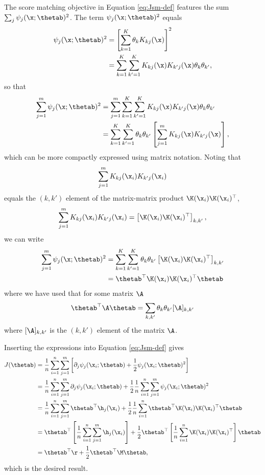 \begin{exenumerate}
\begin{solution}
    The score matching objective in Equation \eqref{eq:Jsm-def}  features the sum $\sum_j \psi_j(\x;\thetab)^2$. The term $\psi_j(\x;\thetab)^2$ equals
    \begin{align}
      \psi_j(\x; \thetab)^2 & = \left[ \sum_{k=1}^K \theta_k K_{kj}(\x)\right]^2\\
      & =  \sum_{k=1}^K \sum_{k'=1}^K  K_{kj}(\x) K_{k'j}(\x) \theta_{k} \theta_{k'},
    \end{align}
    so that
    \begin{align}
      \sum_{j=1}^m \psi_j(\x; \thetab)^2  &= \sum_{j=1}^m  \sum_{k=1}^K \sum_{k'=1}^K  K_{kj}(\x) K_{k'j}(\x) \theta_{k} \theta_{k'}\\
      & = \sum_{k=1}^K \sum_{k'=1}^K \theta_{k} \theta_{k'} \left[ \sum_{j=1}^m K_{kj}(\x) K_{k'j}(\x) \right],
    \end{align}
    which can be more compactly expressed using matrix notation. Noting
    that $$\sum_{j=1}^m K_{kj}(\x_i) K_{k'j}(\x_i)$$ equals the
    $(k,k')$ element of the matrix-matrix product $\K(\x_i)\K(\x_i)^\top$,
    \begin{equation}
      \sum_{j=1}^m K_{kj}(\x_i) K_{k'j}(\x_i) = \left[\K(\x_i)\K(\x_i)^\top\right]_{k,k'},
    \end{equation}
    we can write
    \begin{align}
      \sum_{j=1}^m \psi_j(\x; \thetab)^2 & =  \sum_{k=1}^K \sum_{k'=1}^K \theta_{k} \theta_{k'}  \left[\K(\x_i)\K(\x_i)^\top\right]_{k,k'}\\
      & =  \thetab^\top \K(\x_i)\K(\x_i)^\top \thetab
    \end{align}
    where we have used that for some matrix $\A$
    \begin{equation}
      \thetab^\top \A \thetab = \sum_{k,k'} \theta_k \theta_{k'} [\A]_{k,k'}
    \end{equation}
    where $[\A]_{k,k'}$ is the $(k,k')$ element of the matrix $\A$.
    
    Inserting the expressions into Equation \eqref{eq:Jsm-def} gives
    \begin{align} 
      J(\thetab) &= \frac{1}{n} \sum_{i=1}^n  \sum_{j=1}^m\left[ \partial_j \psi_j(\x_i;\thetab) + \frac{1}{2} \psi_j(\x_i;\thetab)^2 \right] \\
      &= \frac{1}{n} \sum_{i=1}^n  \sum_{j=1}^m \partial_j \psi_j(\x_i;\thetab) + \frac{1}{2}  \frac{1}{n} \sum_{i=1}^n  \sum_{j=1}^m \psi_j(\x_i;\thetab)^2 \\
      & =  \frac{1}{n} \sum_{i=1}^n \sum_{j=1}^m \thetab^\top \h_j(\x_i) + \frac{1}{2} \frac{1}{n} \sum_{i=1}^n \thetab^\top \K(\x_i)\K(\x_i)^\top \thetab\\
        & =  \thetab^\top \left[  \frac{1}{n} \sum_{i=1}^n \sum_{j=1}^m \h_j(\x_i)\right] + \frac{1}{2}  \thetab^\top \left[ \frac{1}{n}\sum_{i=1}^n  \K(\x_i)\K(\x_i)^\top \right] \thetab\\
        & = \thetab^\top \r + \frac{1}{2}\thetab^\top \M \thetab,
    \end{align}
    which is the desired result. 
  \end{solution}


\end{exenumerate}
